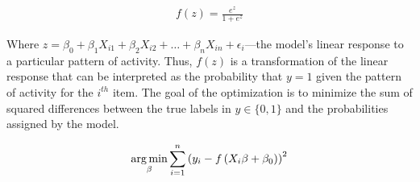 

\begin{align}
f(z) = \frac{e^z}{1+e^{z}}
\label{eq.logisticloss}
\end{align}

Where $z = \beta_0 + \beta_1X_{i 1} + \beta_2X_{i 2} + \dots +  \beta_nX_{i n} + \epsilon_{i}$---the model's linear response to a particular pattern of activity. Thus, $f(z)$ is a transformation of the linear response that can be interpreted as the probability that $y=1$ given the pattern of activity for the $i^{th}$ item. 
The goal of the optimization is to minimize the sum of squared differences between the true labels in $y \in{\{0,1\}}$ and the probabilities assigned by the model.

\begin{align}
\operatorname*{arg\,min}_\beta \sum^{n}_{i=1}{\left(y_i-f\left( X_i\beta + \beta_0\right) \right)^2}
\label{eq.logisticopt}
\end{align}

